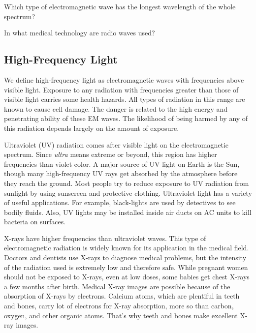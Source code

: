 \documentclass[main.tex]{subfiles}
\begin{document}
\begin{exercise}
    Which type of electromagnetic wave has the longest wavelength of the whole spectrum?
\end{exercise}

\begin{exercise}
    In what medical technology are radio waves used?
\end{exercise}

\clearpage
\subsection{High-Frequency Light} \label{QoTj3l}

We define high-frequency light as electromagnetic waves with frequencies above visible light. Exposure to any radiation with frequencies greater than those of visible light carries some health hazards. All types of radiation in this range are known to cause cell damage. The danger is related to the high energy and penetrating ability of these EM waves. The likelihood of being harmed by any of this radiation depends largely on the amount of exposure. 



\vspace{1em}

Ultraviolet (UV) radiation comes after visible light on the electromagnetic spectrum.  Since \textit{ultra} means extreme or beyond, this region has higher frequencies than violet color. A major source of UV light on Earth is the Sun, though many high-frequency UV rays get absorbed by the atmosphere before they reach the ground. Most people try to reduce exposure to UV radiation from sunlight by using sunscreen and protective clothing. Ultraviolet light has a variety of useful applications. For example, black-lights are used by detectives to see bodily fluids. Also, UV lights may be installed inside air ducts on AC units to kill bacteria on surfaces.  

\vspace{1em}

X-rays have higher frequencies than ultraviolet waves. This type of electromagnetic radiation is widely known for its application in the medical field. Doctors and dentists use X-rays to diagnose medical problems, but the intensity of the radiation used is extremely low and therefore safe. While pregnant women should not be exposed to X-rays, even at low doses, some babies get chest X-rays a few months after birth. Medical X-ray images are possible because of the absorption of X-rays by electrons. Calcium atoms, which are plentiful in teeth and bones, carry lot of electrons for X-ray absorption, more so than carbon, oxygen, and other organic atoms. That's why teeth and bones make excellent X-ray images.
\end{document}

